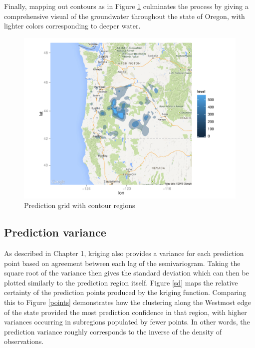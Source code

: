 \documentclass[12pt,twoside]{reedthesis}
\begin{document}
Finally, mapping out contours as in Figure \ref{polygon} culminates the process by giving a comprehensive visual of the groundwater throughout the state of Oregon, with lighter colors corresponding to deeper water.
	
\begin{figure}[h!]
	   
	       \centering
	  
	    \includegraphics[scale=0.7]{polygon_plot}
	
	     \caption{Prediction grid with contour regions}
	 \label{polygon}
	\end{figure}
	
	   
	  
	
	
\subsection{Prediction variance}

As described in Chapter 1, kriging also provides a variance for each prediction point based on agreement between each lag of the semivariogram. Taking the square root of the variance then gives the standard deviation which can then be plotted similarly to the prediction region itself. Figure \ref{sd} maps the relative certainty of the prediction points produced by the kriging function. Comparing this to Figure \ref{points} demonstrates how the clustering along the Westmost edge of the state provided the most prediction confidence in that region, with higher variances occurring in subregions populated by fewer points. In other words, the prediction variance roughly corresponds to the inverse of the density of observations. 
	
\end{document}

